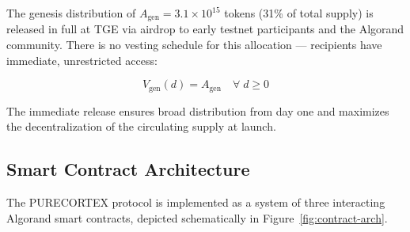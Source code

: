 The genesis distribution of $A_{\text{gen}} = 3.1 \times 10^{15}$ tokens
(31\% of total supply) is released in full at TGE via airdrop to early testnet
participants and the Algorand community. There is no vesting schedule for this
allocation --- recipients have immediate, unrestricted access:

\begin{equation}
  V_{\text{gen}}(d) = A_{\text{gen}} \quad \forall\; d \geq 0
  \label{eq:genesis-vesting}
\end{equation}

The immediate release ensures broad distribution from day one and maximizes
the decentralization of the circulating supply at launch.

\subsection{Smart Contract Architecture}
\label{subsec:contract-arch}

The PURECORTEX protocol is implemented as a system of three interacting
Algorand smart contracts, depicted schematically in
Figure~\ref{fig:contract-arch}.

